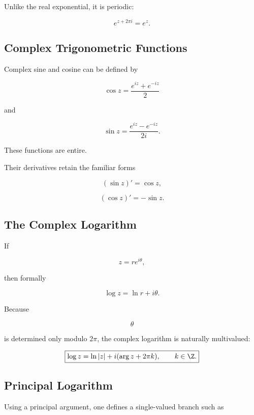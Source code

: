 Unlike the real exponential, it is periodic:

\[
\boxed{
e^{z+2\pi i}=e^z.
}
\]

\subsection{Complex Trigonometric Functions}
\label{subsec:complex-trigonometric-functions}

Complex sine and cosine can be defined by

\[
\boxed{
\cos z
=
\frac{e^{iz}+e^{-iz}}{2}
}
\]

and

\[
\boxed{
\sin z
=
\frac{e^{iz}-e^{-iz}}{2i}.
}
\]

These functions are entire.

Their derivatives retain the familiar forms

\[
\boxed{
(\sin z)'=\cos z,
}
\]

\[
\boxed{
(\cos z)'=-\sin z.
}
\]

\subsection{The Complex Logarithm}
\label{subsec:complex-logarithm}

If

\[
z=re^{i\theta},
\]

then formally

\[
\boxed{
\log z
=
\ln r+i\theta.
}
\]

Because

\[
\theta
\]

is determined only modulo \(2\pi\), the complex logarithm is naturally
multivalued:

\[
\boxed{
\log z
=
\ln|z|
+
i(\arg z+2\pi k),
\qquad
k\in\Z.
}
\]

\subsection{Principal Logarithm}
\label{subsec:principal-logarithm}

Using a principal argument, one defines a single-valued branch such as

